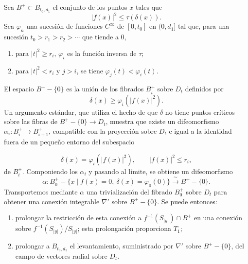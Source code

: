 Sea $B^+\subset B_{t_0,d_1}$ el conjunto de los puntos $x$ tales que
\[
|f(x)|^2\leq\tau(\delta(x)).
\]
Sea $\varphi_n$ una sucesión de funciones $C^\infty$ de
$[0,t_0]$ en $(0,d_1]$ tal que, para una sucesión
$t_0>r_1>r_2>\cdots$ que tiende a $0$,

\begin{enumerate}[label=(\alph*)]
\item para $|t|^2\geq r_i$, $\varphi_i$ es la función inversa de
  $\tau$;
\item para $|t|^2<r_i$ y $j>i$, se tiene
  $\varphi_j(t)<\varphi_i(t)$.
\end{enumerate}

\begin{center}
\end{center}

El espacio $B^+-\{0\}$ es la unión de los fibrados $B_i^+$ sobre
$D_t$ definidos por
\[
\delta(x)\geq\varphi_i(|f(x)|^2).
\]
Un argumento estándar, que utiliza el hecho de que $\delta$ no tiene
puntos críticos sobre las fibras de $B^+-\{0\}\to D_t$, muestra que
existe un difeomorfismo $\alpha_i:B_i^+\to B_{i+1}^+$, compatible con
la proyección sobre $D_t$ e igual a la identidad fuera de un pequeño
entorno del subespacio

\pageoriginale

\[
\delta(x)=\varphi_i(|f(x)|^2),
\qquad |f(x)|^2\leq r_i,
\]
de $B_i^+$. Componiendo los $\alpha_i$ y pasando al límite, se obtiene
un difeomorfismo
\[
\alpha:B_0^+-\{x\mid f(x)=0,\ \delta(x)=\varphi_0(0)\}
\xrightarrow{\ \sim\ }B^+-\{0\}.
\]
Transportemos mediante $\alpha$ una trivialización del fibrado $B_0^+$
sobre $D_t$ para obtener una conexión integrable $\nabla'$ sobre
$B^+-\{0\}$. Se puede entonces:

\begin{enumerate}[label=(\alph*)]
\item prolongar la restricción de esta conexión a
  $f^{-1}(S_{|y|})\cap B^+$ en una conexión sobre
  $f^{-1}(S_{|y|})/S_{|y|}$; esta prolongación proporciona $T_1$;
\item prolongar a $B_{t_0,d_1}$ el levantamiento, suministrado por
  $\nabla'$ sobre $B^+-\{0\}$, del campo de vectores radial sobre $D_t$.
\end{enumerate}

